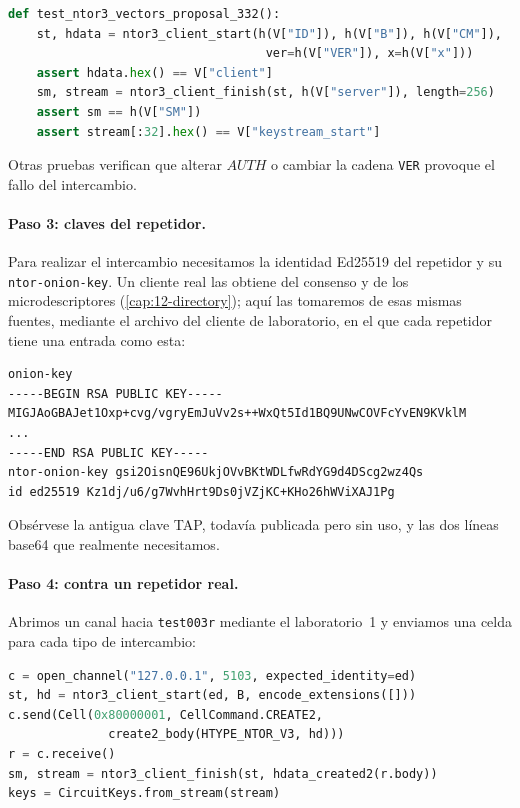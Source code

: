 \begin{lstlisting}[language=Python]
def test_ntor3_vectors_proposal_332():
    st, hdata = ntor3_client_start(h(V["ID"]), h(V["B"]), h(V["CM"]),
                                    ver=h(V["VER"]), x=h(V["x"]))
    assert hdata.hex() == V["client"]
    sm, stream = ntor3_client_finish(st, h(V["server"]), length=256)
    assert sm == h(V["SM"])
    assert stream[:32].hex() == V["keystream_start"]
\end{lstlisting}

Otras pruebas verifican que alterar $\mathit{AUTH}$ o cambiar la cadena \texttt{VER} provoque el fallo del intercambio.

\paragraph{Paso 3: claves del repetidor.} Para realizar el intercambio necesitamos la identidad Ed25519 del repetidor y su \texttt{ntor-onion-key}. Un cliente real las obtiene del consenso y de los microdescriptores (\cref{cap:12-directory}); aquí las tomaremos de esas mismas fuentes, mediante el archivo  del cliente de laboratorio, en el que cada repetidor tiene una entrada como esta:

\begin{lstlisting}[numbers=none]
onion-key
-----BEGIN RSA PUBLIC KEY-----
MIGJAoGBAJet1Oxp+cvg/vgryEmJuVv2s++WxQt5Id1BQ9UNwCOVFcYvEN9KVklM
...
-----END RSA PUBLIC KEY-----
ntor-onion-key gsi2OisnQE96UkjOVvBKtWDLfwRdYG9d4DScg2wz4Qs
id ed25519 Kz1dj/u6/g7WvhHrt9Ds0jVZjKC+KHo26hWViXAJ1Pg
\end{lstlisting}

Obsérvese la antigua clave TAP, todavía publicada pero sin uso, y las dos líneas base64 que realmente necesitamos.

\paragraph{Paso 4: contra un repetidor real.} Abrimos un canal hacia \texttt{test003r} mediante el laboratorio~1 y enviamos una celda  para cada tipo de intercambio:

\begin{lstlisting}[language=Python]
c = open_channel("127.0.0.1", 5103, expected_identity=ed)
st, hd = ntor3_client_start(ed, B, encode_extensions([]))
c.send(Cell(0x80000001, CellCommand.CREATE2,
              create2_body(HTYPE_NTOR_V3, hd)))
r = c.receive()
sm, stream = ntor3_client_finish(st, hdata_created2(r.body))
keys = CircuitKeys.from_stream(stream)
\end{lstlisting}


